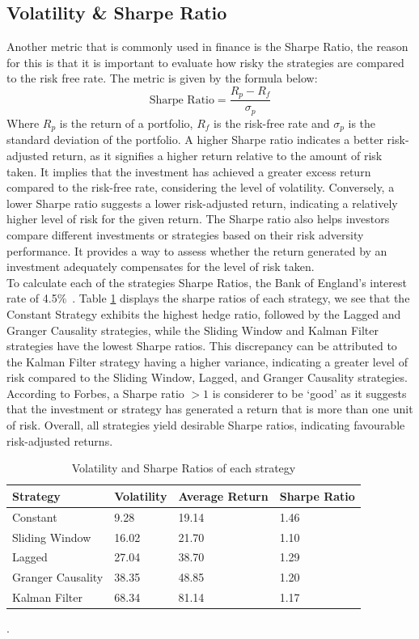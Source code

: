 \subsection{Volatility \& Sharpe Ratio}


Another metric that is commonly used in finance is the Sharpe Ratio, the reason for this is that it is important to evaluate how risky the strategies are compared to the risk free rate. The metric is given by the formula below:$$\text{Sharpe Ratio} = \frac{R_p - R_f}{\sigma_p}$$ Where $R_p$ is the return of a portfolio, $R_f$ is the risk-free rate and $\sigma_p$ is the standard deviation of the portfolio. A higher Sharpe ratio indicates a better risk-adjusted return, as it signifies a higher return relative to the amount of risk taken. It implies that the investment has achieved a greater excess return compared to the risk-free rate, considering the level of volatility. Conversely, a lower Sharpe ratio suggests a lower risk-adjusted return, indicating a relatively higher level of risk for the given return. The Sharpe ratio also helps investors compare different investments or strategies based on their risk adversity performance. It provides a way to assess whether the return generated by an investment adequately compensates for the level of risk taken. 
\\[3mm]
To calculate each of the strategies Sharpe Ratios, the Bank of England's interest rate of 4.5\%~\cite{boe_interest}. Table \ref{tab:sharpes} displays the sharpe ratios of each strategy, we see that the Constant Strategy exhibits the highest hedge ratio, followed by the Lagged and Granger Causality strategies, while the Sliding Window and Kalman Filter strategies have the lowest Sharpe ratios. This discrepancy can be attributed to the Kalman Filter strategy having a higher variance, indicating a greater level of risk compared to the Sliding Window, Lagged, and Granger Causality strategies. According to Forbes, a Sharpe ratio $>1$ is considerer to be `good' as it suggests that the investment or strategy has generated a return that is more than one unit of risk. Overall, all strategies yield desirable Sharpe ratios, indicating favourable risk-adjusted returns.

\begin{table}[H]
    \centering
        \begin{tabular}{|p{7em}|p{7em}|p{7em}|p{7em}|}\hline
            Strategy & Volatility & Average Return & Sharpe Ratio \\\hline
            Constant & 9.28 & 19.14 & 1.46\\\hline
            Sliding Window & 16.02 & 21.70 & 1.10\\\hline
            Lagged & 27.04 & 38.70 & 1.29 \\\hline
            Granger Causality & 38.35 & 48.85 & 1.20\\\hline
            Kalman Filter & 68.34 & 81.14 & 1.17\\\hline
        \end{tabular}
    \caption{Volatility and Sharpe Ratios of each strategy \label{tab:sharpes}}.
\end{table}

